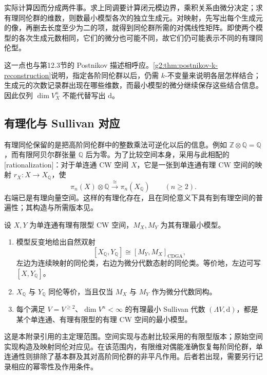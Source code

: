 实际计算因而分成两件事。求上同调要计算闭元模边界，乘积关系由微分决定；求有理同伦群的维数，则数最小模型各次的独立生成元。对映射，先写出每个生成元的像，再删去长度至少为二的项，就得到同伦群所需的对偶线性矩阵。即使两个模型的各次生成元数相同，它们的微分也可能不同，故它们仍可能表示不同的有理同伦型。

\ProseParagraphBreak

这一点也与第12.3节的 Postnikov 描述相呼应。\cref{g2:thm:postnikov-k-reconstruction}说明，指定各阶同伦群以后，仍需 \(k\)-不变量来说明各层怎样结合；生成元的次数记录群出现在哪些维数，而最小模型的微分继续保存这些结合信息。因此仅列 \(\dim V_X^n\) 不能代替写出 \(\mathrm d\)。

\subsection{有理化与 Sullivan 对应}
\label{g2:subsec:E02:05}

有理同伦保留的是把高阶同伦群中的整数乘法可逆化以后的信息。例如 \(\mathbb Z\otimes\mathbb Q=\mathbb Q\)，而有限阿贝尔群张量 \(\mathbb Q\) 后为零。为了比较空间本身，采用与此相配的[rationalization]：对于单连通 CW 空间 \(X\)，它是一张到单连通有理 CW 空间的映射 \(r_X:X\to X_{\mathbb Q}\)，使
\[
	\pi_n(X)\otimes\mathbb Q\xrightarrow{\ \cong\ }\pi_n(X_{\mathbb Q})\qquad(n\ge2).
\]
右端已是有理向量空间。这样的有理化存在，且在同伦意义下具有到有理空间的普遍性；其构造与所需版本见\cite[第8节，第22页]{FelixHalperin2017SullivanModels}。

\begin{theorem}\label{g2:thm:sullivan-rational-equivalence}
	设 \(X,Y\) 为单连通有理有限型 CW 空间，\(M_X,M_Y\) 为其有理最小模型。
	\begin{enumerate}
		\item 模型反变地给出自然双射
		\[
			[X_{\mathbb Q},Y_{\mathbb Q}]\cong[M_Y,M_X]_{\mathrm{CDGA}},
		\]
		左边为连续映射的同伦类，右边为微分代数态射的同伦类。等价地，左边可写 \([X,Y_{\mathbb Q}]\)。
		\item \(X_{\mathbb Q}\) 与 \(Y_{\mathbb Q}\) 同伦等价，当且仅当 \(M_X\) 与 \(M_Y\) 作为微分代数同构。
		\item 每个满足 \(V=V^{\ge2}\)、\(\dim V^n<\infty\) 的有理最小 Sullivan 代数 \((\Lambda V,\mathrm d)\)，都是某个单连通、有理有限型的有理 CW 空间的最小模型。
	\end{enumerate}
\end{theorem}

这是本附录引用的主定理范围。空间实现与态射比较采用\cite[第3节，第18页；第4节，定理4.2，第19页；第8节，第22页]{FelixHalperin2017SullivanModels}的有限型版本；原始空间实现构造及映射同伦对应见\cite[第8节，定理8.1及注释(i)，第301—303页；第10节，定理10.1]{Sullivan1977Infinitesimal}。在该范围内，有限维对偶能准确恢复每阶同伦群，单连通性则排除了基本群及其对高阶同伦群的非平凡作用。后者若出现，需要另行记录相应的幂零性及作用条件。

